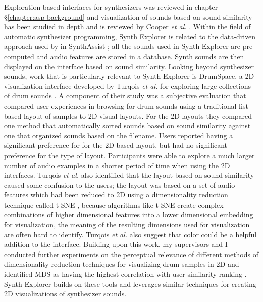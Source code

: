 Exploration-based interfaces for synthesizers was reviewed in chapter \S\ref{chapter:asp-background} and visualization of sounds based on sound similarity has been studied in depth and is reviewed by Cooper \textit{et al.} \cite{cooper2006visualization}. Within the field of automatic synthesizer programming, Synth Explorer is related to the data-driven approach used by in SynthAssist \cite{cartwright2014synthassist}; all the sounds used in Synth Explorer are pre-computed and audio features are stored in a database. Synth sounds are then displayed on the interface based on sound similarity. Looking beyond synthesizer sounds, work that is particularly relevant to Synth Explorer is DrumSpace, a 2D visualization interface developed by Turqois \textit{et al.} for exploring large collections of drum sounds \cite{turquois2016exploring}. A component of their study was a subjective evaluation that compared user experiences in browsing for drum sounds using a traditional list-based layout of samples to 2D visual layouts. For the 2D layouts they compared one method that automatically sorted sounds based on sound similarity against one that organized sounds based on the filename. Users reported having a significant preference for for the 2D based layout, but had no significant preference for the type of layout. Participants were able to explore a much larger number of audio examples in a shorter period of time when using the 2D interfaces. Turqois \textit{et al.} also identified that the layout based on sound similarity caused some confusion to the users; the layout was based on a set of audio features which had been reduced to 2D using a dimensionality reduction technique called t-SNE \cite{van2008visualizing}, because algorithms like t-SNE create complex combinations of higher dimensional features into a lower dimensional embedding for visualization, the meaning of the resulting dimensions used for visualization are often hard to identify. Turqois \textit{ et al.} also suggest that color could be a helpful addition to the interface. Building upon this work, my supervisors and I conducted further experiments on the perceptual relevance of different methods of dimensionality reduction techniques for visualizing drum samples in 2D and identified MDS as having the highest correlation with user similarity ranking \cite{shier2021manifold}. Synth Explorer builds on these tools and leverages similar techniques for creating 2D visualizations of synthesizer sounds.

